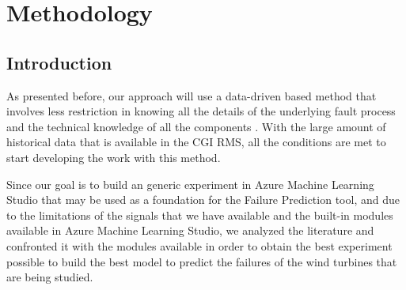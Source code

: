 


\chapter{Methodology}
\label{cha:introduction}

\section{Introduction} 
\label{sub:if_you_use_this_template} 

As presented before, our approach will use a data-driven based method that involves less restriction in knowing all the details of the underlying fault process and the technical knowledge of all the components \cite{OLD_19_WIND}. With the large amount of historical data that is available in the CGI RMS, all the conditions are met to start developing the work with this method.

Since our goal is to build an generic experiment in Azure Machine Learning Studio that may be used as a foundation for the Failure Prediction tool, and due to the limitations of the signals that we have available and the built-in modules available in Azure Machine Learning Studio, we analyzed the literature and confronted it with the modules available in order to obtain the best experiment possible to build the best model to predict the failures of the wind turbines that are being studied.




